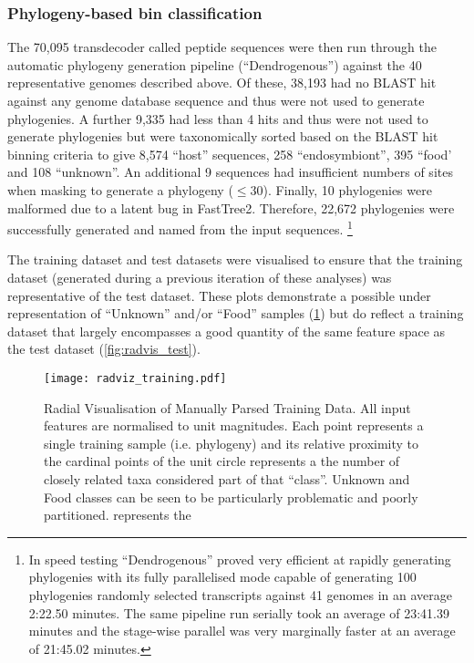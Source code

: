 \subsubsection{Phylogeny-based bin classification}
The 70,095 transdecoder called peptide sequences were then run through
the automatic phylogeny generation pipeline (``Dendrogenous'') against the 40
representative genomes described above. 
Of these, 38,193 had no BLAST hit against any genome database sequence and thus were
not used to generate phylogenies.  A further 9,335 had less than 4 hits 
and thus were not used to generate phylogenies but were taxonomically sorted based
on the BLAST hit binning criteria to give 8,574 ``host'' sequences,  258 ``endosymbiont'',
395 ``food' and 108 ``unknown''.   
An additional 9 sequences had insufficient numbers of sites 
when masking to generate a phylogeny (\(\leq30\)).  Finally, 10 phylogenies
were malformed due to a latent bug in FastTree2.  
Therefore, 22,672 phylogenies were successfully generated and named from the input sequences.
\footnote{In speed testing ``Dendrogenous'' proved very efficient at rapidly generating phylogenies with its
	fully parallelised mode capable of generating 100 phylogenies randomly selected transcripts against 41 genomes in an average 2:22.50 minutes.
	The same pipeline run serially took an average of 23:41.39 minutes and the stage-wise parallel was very marginally faster at 
	an average of 21:45.02 minutes.}

The training dataset and test datasets were visualised to ensure that the training dataset 
(generated during a previous iteration of these analyses) was representative of the 
test dataset.   These plots demonstrate a possible under representation of ``Unknown'' and/or ``Food'' samples (\cref{fig:radvis_training}) but do reflect a training dataset that largely encompasses a good quantity of the same
feature space as the test dataset (\cref{fig:radvis_test}).

\begin{figure}[h!]
		\centering
		\texttt{[image: radviz\_training.pdf]}
        \caption[Radial visualisation of training data]{Radial Visualisation of Manually Parsed Training Data. All input features are normalised to 
			unit magnitudes.  Each point represents a single training sample (i.e. phylogeny) and its relative proximity
			to the cardinal points of the unit circle represents a the number of closely related taxa considered part of
			that ``class''.  Unknown and Food classes can be seen to be particularly problematic and poorly partitioned.
			represents the}
		\label{fig:radvis_training}
	\end{figure}

